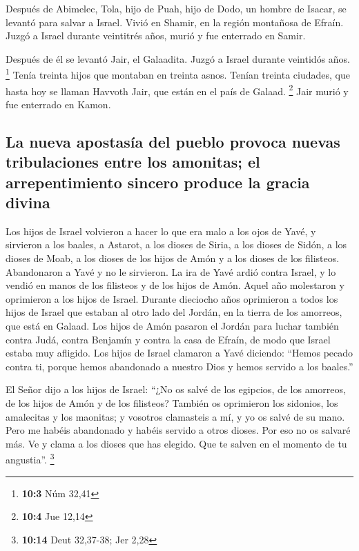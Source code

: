  Después de Abimelec, Tola, hijo de Puah, hijo de Dodo, un
hombre de Isacar, se levantó para salvar a Israel. Vivió en Shamir, en
la región montañosa de Efraín.  Juzgó a Israel durante
veintitrés años, murió y fue enterrado en Samir.

 Después de él se levantó Jair, el Galaadita. Juzgó a
Israel durante veintidós años. \footnote{\textbf{10:3} Núm 32,41}
 Tenía treinta hijos que montaban en treinta asnos. Tenían
treinta ciudades, que hasta hoy se llaman Havvoth Jair, que están en el
país de Galaad. \footnote{\textbf{10:4} Jue 12,14}  Jair
murió y fue enterrado en Kamon.

\hypertarget{la-nueva-apostasuxeda-del-pueblo-provoca-nuevas-tribulaciones-entre-los-amonitas-el-arrepentimiento-sincero-produce-la-gracia-divina}{%
\subsection{La nueva apostasía del pueblo provoca nuevas tribulaciones
entre los amonitas; el arrepentimiento sincero produce la gracia
divina}\label{la-nueva-apostasuxeda-del-pueblo-provoca-nuevas-tribulaciones-entre-los-amonitas-el-arrepentimiento-sincero-produce-la-gracia-divina}}

 Los hijos de Israel volvieron a hacer lo que era malo a
los ojos de Yavé, y sirvieron a los baales, a Astarot, a los dioses de
Siria, a los dioses de Sidón, a los dioses de Moab, a los dioses de los
hijos de Amón y a los dioses de los filisteos. Abandonaron a Yavé y no
le sirvieron.  La ira de Yavé ardió contra Israel, y lo
vendió en manos de los filisteos y de los hijos de Amón. 
Aquel año molestaron y oprimieron a los hijos de Israel. Durante
dieciocho años oprimieron a todos los hijos de Israel que estaban al
otro lado del Jordán, en la tierra de los amorreos, que está en Galaad.
 Los hijos de Amón pasaron el Jordán para luchar también
contra Judá, contra Benjamín y contra la casa de Efraín, de modo que
Israel estaba muy afligido.  Los hijos de Israel clamaron
a Yavé diciendo: ``Hemos pecado contra ti, porque hemos abandonado a
nuestro Dios y hemos servido a los baales.''

 El Señor dijo a los hijos de Israel: ``¿No os salvé de
los egipcios, de los amorreos, de los hijos de Amón y de los filisteos?
 También os oprimieron los sidonios, los amalecitas y los
maonitas; y vosotros clamasteis a mí, y yo os salvé de su mano.
 Pero me habéis abandonado y habéis servido a otros
dioses. Por eso no os salvaré más.  Ve y clama a los
dioses que has elegido. Que te salven en el momento de tu angustia''.
\footnote{\textbf{10:14} Deut 32,37-38; Jer 2,28}

